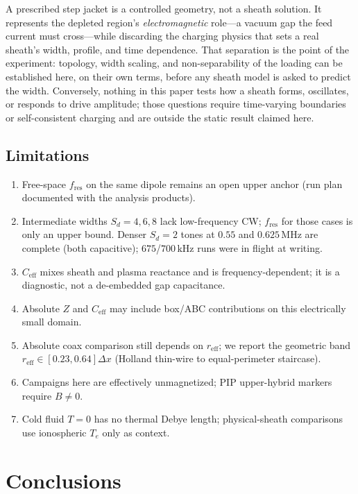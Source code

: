 \documentclass[draft]{agujournal2025}
\begin{document}
A prescribed step jacket is a controlled geometry, not a sheath solution. It represents the depleted region's \emph{electromagnetic} role---a vacuum gap the feed current must cross---while discarding the charging physics that sets a real sheath's width, profile, and time dependence. That separation is the point of the experiment: topology, width scaling, and non-separability of the loading can be established here, on their own terms, before any sheath model is asked to predict the width. Conversely, nothing in this paper tests how a sheath forms, oscillates, or responds to drive amplitude; those questions require time-varying boundaries or self-consistent charging and are outside the static result claimed here.

\subsection{Limitations}

\begin{enumerate}
\item Free-space \(f_\mathrm{res}\) on the same dipole remains an open upper anchor (run plan documented with the analysis products).
\item Intermediate widths \(S_d=4,6,8\) lack low-frequency CW; \(f_\mathrm{res}\) for those cases is only an upper bound. Denser \(S_d=2\) tones at \(0.55\) and \(0.625\,\mathrm{MHz}\) are complete (both capacitive); \(675\)/\(700\,\mathrm{kHz}\) runs were in flight at writing.
\item \(C_\mathrm{eff}\) mixes sheath and plasma reactance and is frequency-dependent; it is a diagnostic, not a de-embedded gap capacitance.
\item Absolute \(Z\) and \(C_\mathrm{eff}\) may include box/ABC contributions on this electrically small domain.
\item Absolute coax comparison still depends on \(r_\mathrm{eff}\); we report the geometric band \(r_\mathrm{eff}\in[0.23,0.64]\Delta x\) (Holland thin-wire to equal-perimeter staircase).
\item Campaigns here are effectively unmagnetized; PIP upper-hybrid markers require \(B\neq 0\).
\item Cold fluid \(T=0\) has no thermal Debye length; physical-sheath comparisons use ionospheric \(T_e\) only as context.
\end{enumerate}

\section{Conclusions}
\end{document}

